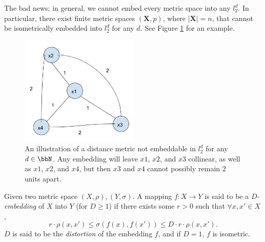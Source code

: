The bad news: in general, we cannot embed every metric space into any $l_2^d$.
In particular, there exist finite metric spaces
$(\mathbf{X},p)$, where $|\mathbf{X}| = n$, that
cannot be isometrically embedded into $l_2^d$ for any $d$.
See Figure \ref{fig:unembeddable} for an example. 

\begin{figure}[h!]
\begin{center}
\includegraphics[width=0.5\textwidth]{chapter_5/files/unembeddable.jpg}
\caption{An illustration of a distance metric not embeddable in $l_2^d$ for any $d \in \bbN$.
Any embedding will leave $x1$, $x2$, and $x3$ collinear, as well as $x1$, $x2$, and $x4$,
but then $x3$ and $x4$ cannot possibly remain $2$ units apart.}
\label{fig:unembeddable}
\end{center}
\end{figure}

\begin{definition}
Given two metric space $(X,\rho), (Y,\sigma)$. A mapping $f:
X\rightarrow Y$ is said to be a \emph{$D$-embedding} of $X$ into $Y$
(for $D\geq 1$) if there exists some $r>0$ such that $\forall x,x'
\in X$, 
\[
r \cdot \rho(x,x') \leq \sigma(f(x),f(x')) \leq D \cdot r \cdot
\rho(x,x').
\]
$D$ is said to be the \emph{distortion} of the embedding $f$, and if $D=1$, $f$ is isometric.
\end{definition}
